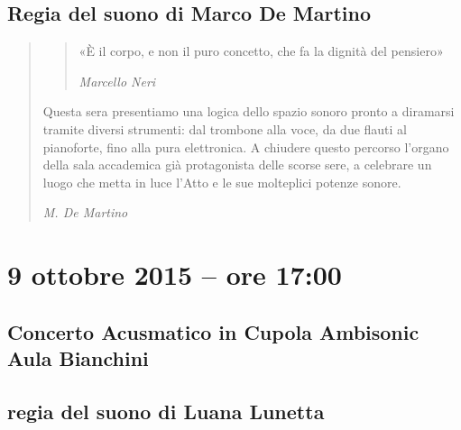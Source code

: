 \documentclass[8pt, twoside, a5paper]{extreport}
\begin{document}
{\fontsize{30}{30} }

\subsection*{\textsf{Regia del suono di Marco De Martino}}

\begin{quote}

{\svolk \small
\begin{quote}«È il corpo, e non il puro concetto, che fa la dignità del pensiero»

\hspace{1mm}\emph{Marcello Neri}
\end{quote}

Questa sera presentiamo una logica dello spazio sonoro pronto a diramarsi tramite diversi strumenti: dal trombone alla voce, da due flauti al pianoforte, fino alla pura elettronica. A chiudere questo percorso l'organo della sala accademica già protagonista delle scorse sere, a celebrare un luogo che metta in luce l'Atto e le sue molteplici potenze sonore.}

\emph{M. De Martino}
\end{quote}    


\smallskip

\begin{multicols}{2}




\end{multicols}

\clearpage


\section*{9 ottobre 2015 -- ore 17:00}

\subsection*{{\small Concerto Acusmatico in Cupola Ambisonic} \\
	\textsf{Aula Bianchini}}

{\fontsize{30}{30} }

\subsection*{\textsf{regia del suono di Luana Lunetta}}
\end{document}

